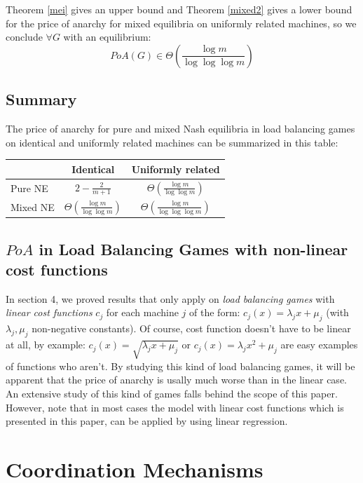 \documentclass[a4paper,11pt]{article}
\begin{document}
Theorem \ref{mei} gives an upper bound and Theorem \ref{mixed2} gives a lower bound  for the price of anarchy for mixed equilibria on uniformly related machines, so we conclude $\forall G$ with an equilibrium:
$$PoA(G) \in \Theta\left(\frac{\log m}{\log \log \log m}\right)$$


\subsection{Summary}
The price of anarchy for pure and mixed Nash equilibria in load balancing games on identical and uniformly related machines can be summarized in this table:

\begin{center}
\begin{tabular}{l|c|c}

   & Identical & Uniformly related \\
   \hline

   \hline
  Pure NE & $2-\frac{2}{m+1}$ & $\Theta\left(\frac{\log m}{\log \log m}\right)$ \\
  \hline
  Mixed NE & $\Theta\left(\frac{\log m}{\log \log m}\right)$ & $\Theta\left(\frac{\log m}{\log \log \log m}\right)$ \\
  \hline
\end{tabular}
\end{center}
\subsection{$PoA$ in Load Balancing Games with non-linear cost functions}
In section 4, we proved results that only apply on \emph{load balancing games} with \emph{linear cost functions} $c_j$ for each machine $j$ of the form: $c_j(x) = \lambda_jx+\mu_j$ (with $\lambda_j, \mu_j$ non-negative constants). Of course, cost function doesn't have to be linear at all, by example: $c_j(x) = \sqrt{\lambda_jx+\mu_j}$ or $c_j(x) =\lambda_jx^2+\mu_j$ are easy examples of functions who aren't. By studying this kind of load balancing games, it will be apparent that the price of anarchy is usally much worse than in the linear case. An extensive study of this kind of games falls behind the scope of this paper. However, note that in most cases the model with linear cost functions which is presented in this paper, can be applied by using linear regression.
\section{Coordination Mechanisms}
\end{document}
